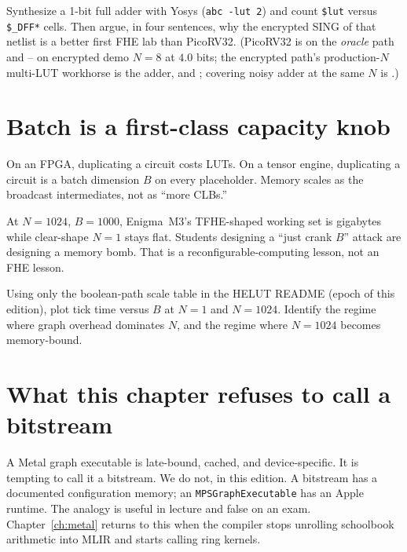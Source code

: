 \begin{exercise}
Synthesize a 1-bit full adder with Yosys (\texttt{abc -lut 2}) and count
\texttt{\$lut} versus \texttt{\$\_DFF*} cells.
Then argue, in four sentences, why the encrypted SING of that netlist is a
better first FHE lab than PicoRV32. (PicoRV32 is  on the \emph{oracle}
path and -- on encrypted demo $N{=}8$ at $4.0$ bits; the
encrypted path's production-$N$ multi-LUT workhorse is the adder, 
and ; covering noisy adder at the same $N$ is .)
\end{exercise}

\section{Batch is a first-class capacity knob}

On an FPGA, duplicating a circuit costs LUTs.
On a tensor engine, duplicating a circuit is a batch dimension $B$ on every
placeholder.
Memory scales as the broadcast intermediates, not as ``more CLBs.''


At $N=1024$, $B=1000$, Enigma~M3's TFHE-shaped working set is gigabytes while
clear-shape $N=1$ stays flat.
Students designing a ``just crank $B$'' attack are designing a memory bomb.
That is a reconfigurable-computing lesson, not an FHE lesson.

\begin{exercise}
Using only the boolean-path scale table in the HELUT README (epoch of this
edition), plot tick time versus $B$ at $N=1$ and $N=1024$.
Identify the regime where graph overhead dominates $N$, and the regime where
$N=1024$ becomes memory-bound.
\end{exercise}

\section{What this chapter refuses to call a bitstream}

A Metal graph executable is late-bound, cached, and device-specific.
It is tempting to call it a bitstream.
We do not, in this edition.
A bitstream has a documented configuration memory; an \texttt{MPSGraphExecutable}
has an Apple runtime.
The analogy is useful in lecture and false on an exam.
Chapter~\ref{ch:metal} returns to this when the compiler stops unrolling
schoolbook arithmetic into MLIR and starts calling ring kernels.
